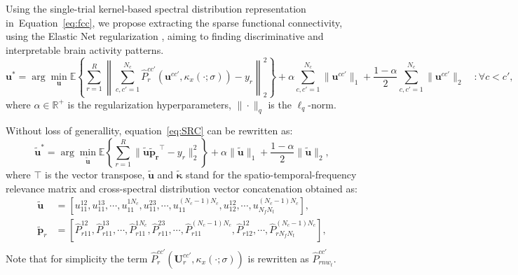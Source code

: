 \documentclass[runningheads]{llncs}
\providecommand{\promed}[1]{{\mathbb{E}}\left\lbrace
#1\right\rbrace}%
\newcommand{\Real}{\mathbb{R}}
\newcommand{\ve}[1]{\bm {#1}}
\newcommand{\mat}[1]{\bm {#1}}
\newenvironment{reviewer}{\setcounter{pointcounter}{1}}{}
\newcommand{\changes}[1]{\textcolor[rgb]{1.00,0.00,0.00}{#1}}
\begin{document}
\begin{reviewer}
{    \changes{Using the single-trial kernel-based spectral
      distribution representation in~Equation~\eqref{eq:fcc}, we
      propose extracting the sparse functional connectivity, using
      the Elastic Net regularization \cite{tay2023elastic}, aiming to
      finding discriminative and interpretable brain activity patterns.
      \begin{equation}\label{eq:SRC}
        \ve{u}^* = \arg \min_{\ve{u}} \promed{ \sum_{r=1}^{R}
        \left\|\sum_{c,c'=1}^{N_c}\hat{P}^{cc'}_{r}(\ve{u}^{cc'},\kappa_x(\cdot;\sigma))-y_r\right\|^2_2}
        + \alpha \sum_{c,c'=1}^{N_c}\|\ve{u}^{cc'}\|_1 +
        \frac{1-\alpha}{2} \sum_{c,c'=1}^{N_c}\|\ve{u}^{cc'}\|_2
        \quad :  \forall c < c',
      \end{equation}
      where $\alpha \in \Real^+$ is the regularization
      hyperparameters, $\| \cdot \|_q$ is the $\ell_q$-norm.
    }

    \changes{Without loss of generallity, equation~\eqref{eq:SRC} can
      be rewritten as:
      \begin{equation}
        \ve{\tilde{u}}^* = \arg \min_{\ve{\tilde{u}}}
        \promed{\sum_{r=1}^{R}
        \|\ve{\tilde{u}}\ve{\tilde{p}_{r}}^{\top}-y_r\|^2_2} + \alpha
        \|\ve{\tilde{u}}\|_1 + \frac{1-\alpha}{2}
        \|\ve{\tilde{u}}\|_2, \label{eq:SRC_vec}
      \end{equation}
      where $\top$ is the vector transpose, $\ve{\tilde{u}}$ and
      $\ve{\tilde{\kappa}}$ stand for the spatio-temporal-frequency
      relevance matrix and cross-spectral distribution vector
      concatenation obtained as:
      \begin{equation}
        \begin{aligned}
          \ve{\tilde{u}} &=
          \left[u_{11}^{12},u_{11}^{13},\cdots,u_{11}^{1N_c},u_{11}^{23},\cdots,u_{11}^{(N_c-1)N_c},u_{12}^{12},\cdots,
          u_{N_fN_t}^{(N_c-1)N_c} \right], \\
          \ve{\tilde{p}}_{r} &= \left[
            \hat{P}_{r11}^{12},\hat{P}_{r11}^{13},\cdots,\hat{P}_{r11}^{1N_c},\hat{P}_{r11}^{23},\cdots,\hat{P}_{r11}^{(N_c-1)N_c},\hat{P}_{r12}^{12},\cdots,
          \hat{P}_{rN_fN_t}^{(N_c-1)N_c} \right] ,\\
        \end{aligned}
      \end{equation}
      Note that for simplicity the term
      $\hat{P}^{cc'}_{r}(\mat{U}^{cc'}_{r},\kappa_x\left(\cdot;\sigma\right))$
      is rewritten as $\hat{P}^{cc'}_{rnw_t}$.
    }
  }


\end{reviewer}
\end{document}
